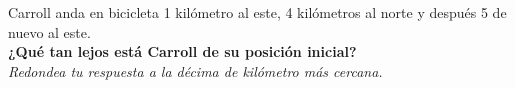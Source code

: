 Carroll anda en bicicleta 1 kilómetro al este, 4 kilómetros al norte y después 5 de nuevo al este.\\
\textbf{¿Qué tan lejos está Carroll de su posición inicial?}\\
\textit{Redondea tu respuesta a la décima de kilómetro más cercana.}